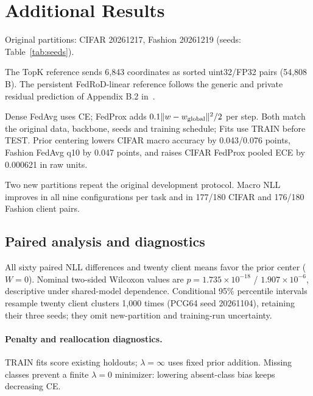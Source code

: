 \appendix
\section{Additional Results}\label{app:complete}

Original partitions: CIFAR 20261217, Fashion 20261219 (seeds: Table~\ref{tab:seeds}).



The TopK reference sends 6,843 coordinates as sorted uint32/FP32 pairs (54,808 B). The persistent FedRoD-linear reference follows the generic and private residual prediction of Appendix B.2 in~\cite{chen2022fedrod}.

Dense FedAvg uses CE; FedProx adds $0.1\|w-w_{\rm global}\|^2/2$ per step. Both match the original data, backbone, seeds and training schedule; Fits use TRAIN before TEST. Prior centering lowers CIFAR macro accuracy by 0.043/0.076 points, Fashion FedAvg q10 by 0.047 points, and raises CIFAR FedProx pooled ECE by 0.000621 in raw units.

Two new partitions repeat the original development protocol. Macro NLL improves in all nine configurations per task and in 177/180 CIFAR and 176/180 Fashion client pairs.

\subsection*{Paired analysis and diagnostics}\label{app:statistics}
All sixty paired NLL differences and twenty client means favor the prior center ($W=0$). Nominal two-sided Wilcoxon values are $p=1.735\times10^{-18}$ / $1.907\times10^{-6}$, descriptive under shared-model dependence. Conditional 95\% percentile intervals resample twenty client clusters 1,000 times (PCG64 seed 20261104), retaining their three seeds; they omit new-partition and training-run uncertainty. 

\paragraph{Penalty and reallocation diagnostics.}\label{app:sensitivity}
TRAIN fits score existing holdouts; $\lambda=\infty$ uses fixed prior addition. Missing classes prevent a finite $\lambda=0$ minimizer: lowering absent-class bias keeps decreasing CE.

